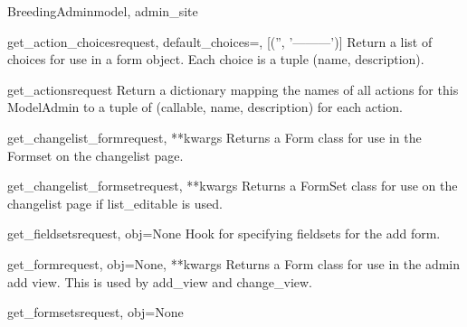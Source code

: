 \documentclass[letterpaper,10pt,english]{sphinxmanual}
\begin{document}
\begin{classdesc}{BreedingAdmin}{model, admin\_site}
\hypertarget{animal.admin.BreedingAdmin.get_action_choices}{}\begin{methoddesc}{get\_action\_choices}{request, default\_choices=, {[}('', '---------'){]}}
Return a list of choices for use in a form object.  Each choice is a
tuple (name, description).
\end{methoddesc}

\hypertarget{animal.admin.BreedingAdmin.get_actions}{}\begin{methoddesc}{get\_actions}{request}
Return a dictionary mapping the names of all actions for this
ModelAdmin to a tuple of (callable, name, description) for each action.
\end{methoddesc}

\hypertarget{animal.admin.BreedingAdmin.get_changelist_form}{}\begin{methoddesc}{get\_changelist\_form}{request, **kwargs}
Returns a Form class for use in the Formset on the changelist page.
\end{methoddesc}

\hypertarget{animal.admin.BreedingAdmin.get_changelist_formset}{}\begin{methoddesc}{get\_changelist\_formset}{request, **kwargs}
Returns a FormSet class for use on the changelist page if list\_editable
is used.
\end{methoddesc}

\hypertarget{animal.admin.BreedingAdmin.get_fieldsets}{}\begin{methoddesc}{get\_fieldsets}{request, obj=None}
Hook for specifying fieldsets for the add form.
\end{methoddesc}

\hypertarget{animal.admin.BreedingAdmin.get_form}{}\begin{methoddesc}{get\_form}{request, obj=None, **kwargs}
Returns a Form class for use in the admin add view. This is used by
add\_view and change\_view.
\end{methoddesc}

\hypertarget{animal.admin.BreedingAdmin.get_formsets}{}\begin{methoddesc}{get\_formsets}{request, obj=None}\end{methoddesc}


\end{classdesc}
\end{document}
